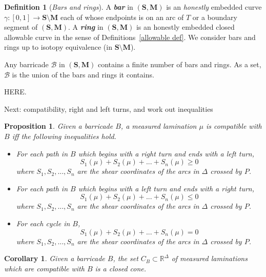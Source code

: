 \documentclass{amsart}
\newtheorem{corollary}[proposition]{Corollary}
\newtheorem{prop}[proposition]{Proposition}
\theoremstyle{definition}
\newtheorem{definition}[proposition]{Definition}
\theoremstyle{remark}
\numberwithin{equation}{section}
\newcommand{\newword}[1]{\textbf{\emph{#1}}}
\newcommand{\0}{{\mathbf{0}}}
\newcommand{\B}{\mathcal{B}}
\newcommand{\M}{\mathbf{M}}
\renewcommand{\S}{\mathbf{S}}
\begin{document}
\begin{definition}[\emph{Bars and rings}]\label{barring def}
A \newword{bar} in $(\S,\M)$ is an \emph{honestly} embedded curve $\gamma:[0,1]\to \S\setminus\M$ each of whose endpoints is on an arc of $T$ or a boundary segment of $(\S,\M)$.
A \newword{ring} in $(\S,\M)$ is an honestly embedded closed allowable curve in the sense of Definitions~\ref{allowable def}.
We consider bars and rings up to isotopy equivalence (in $\S\setminus\M$).
\end{definition}

Any barricade $\B$ in $(\S,\M)$ contains a finite number of bars and rings.
As a set, $\B$ is the union of the bars and rings it contains.

HERE.  

Next:  compatibility, right and left turns, and work out inequalities







\begin{prop}\label{prop: inequalities}
Given a barricade $B$, a measured lamination $\mu$ is compatible with $B$ iff the following inequalities hold.
\begin{itemize}
	\item For each path in $B$ which begins with a right turn and ends with a left turn,
	\[ S_{1}(\mu) + S_{2}(\mu) + ... + S_{n}(\mu) \geq 0\]
	where $S_1, S_2,...,S_n$ are the shear coordinates of the arcs in $\Delta$ crossed by $P$.
	\item For each path in $B$ which begins with a left turn and ends with a right turn, 
	\[ S_{1}(\mu) + S_{2}(\mu) + ... + S_{n}(\mu) \leq 0\]
	where $S_1, S_2,...,S_n$ are the shear coordinates of the arcs in $\Delta$ crossed by $P$.
	\item For each cycle in $B$, 
	\[ S_{1}(\mu) + S_{2}(\mu) + ... + S_{n}(\mu) = 0\]
	where $S_1, S_2,...,S_n$ are the shear coordinates of the arcs in $\Delta$ crossed by $P$.
\end{itemize}
\end{prop}


\begin{corollary}
Given a barricade $B$, the set $C_B\subset \mathbb{R}^\Delta$ of measured laminations which are compatible with $B$ is a closed cone. 
\end{corollary}
\end{document}
